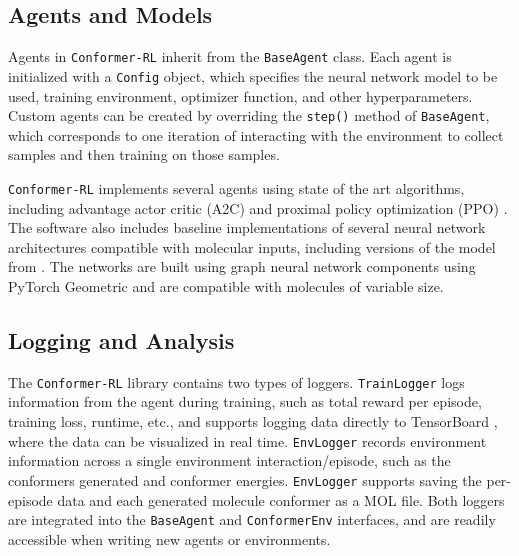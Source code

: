 \documentclass[twoside,11pt]{article}
\newcommand{\code}[1]{\texttt{#1}}
\newcommand{\titleofpaper}{Conformer-RL}
\newcommand{\genComment}[2]{\ifnum\comments=1{\color{#1}{\textsf{\footnotesize #2}}}\fi}
\newcommand{\josh}[1]{\genComment{purple}{[JK:#1]}}
\begin{document}

\subsection{Agents and Models}
Agents in \code{\titleofpaper} inherit from the \code{BaseAgent} class. Each agent is initialized with a \code{Config} object, which specifies the neural network model to be used, training environment, optimizer function, and other hyperparameters. Custom agents can be created by overriding the \code{step()} method of \code{BaseAgent}, which corresponds to one iteration of interacting with the environment to collect samples and then training on those samples.

\code{\titleofpaper} implements several agents using state of the art algorithms, including advantage actor critic (A2C) \citep{wu2017a2c} and proximal policy optimization (PPO) \citep{schulman2017ppo}. The software also includes baseline implementations of several neural network architectures compatible with molecular inputs, including versions of the model from \citep{gogineni2020torsionnet}. The networks are built using graph neural network components using PyTorch Geometric \citep{fey2019geometric} and are compatible with molecules of variable size.

\subsection{Logging and Analysis}
The \code{\titleofpaper} library contains two types of loggers. \code{TrainLogger} logs information from the agent during training, such as total reward per episode, training loss, runtime, etc., and supports logging data directly to TensorBoard \citep{tensorflow2015-whitepaper}, where the data can be visualized in real time. \code{EnvLogger} records environment information across a single environment interaction/episode, such as the conformers generated and conformer energies. \code{EnvLogger} supports saving the per-episode data and each generated molecule conformer as a MOL file. Both loggers are integrated into the \code{BaseAgent} and \code{ConformerEnv} interfaces, and are readily accessible when writing new agents or environments.
\end{document}
